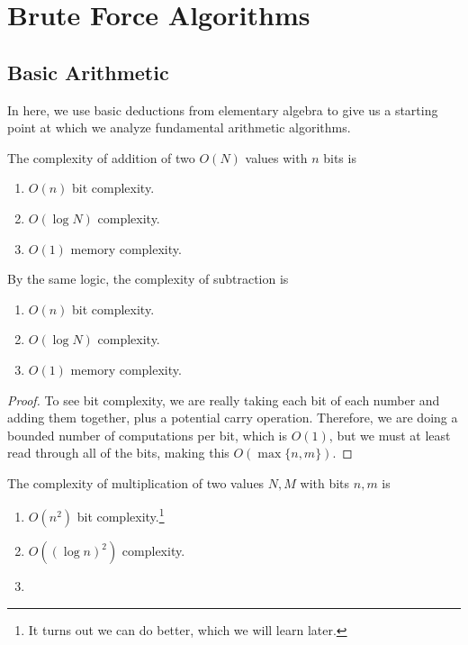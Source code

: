 \documentclass{article}
\begin{document}
\section{Brute Force Algorithms} 

  \subsection{Basic Arithmetic}

    In here, we use basic deductions from elementary algebra to give us a starting point at which we analyze fundamental arithmetic algorithms. 

    \begin{theorem}
      The complexity of addition of two $O(N)$ values with $n$ bits is
      \begin{enumerate}
        \item $O(n)$ bit complexity. 
        \item $O(\log N)$ complexity. 
        \item $O(1)$ memory complexity. 
      \end{enumerate}
      By the same logic, the complexity of subtraction is 
      \begin{enumerate}
        \item $O(n)$ bit complexity. 
        \item $O(\log N)$ complexity. 
        \item $O(1)$ memory complexity. 
      \end{enumerate}
    \end{theorem}
    \begin{proof}
      To see bit complexity, we are really taking each bit of each number and adding them together, plus a potential carry operation. Therefore, we are doing a bounded number of computations per bit, which is $O(1)$, but we must at least read through all of the bits, making this $O(\max\{n, m\})$. 
    \end{proof}

    \begin{theorem}
      The complexity of multiplication of two values $N, M$ with bits $n, m$ is 
      \begin{enumerate}
        \item $O(n^2)$ bit complexity.\footnote{It turns out we can do better, which we will learn later.} 
        \item $O((\log n)^2)$ complexity. 
        \item 
      \end{enumerate}
    \end{theorem}
\end{document}
